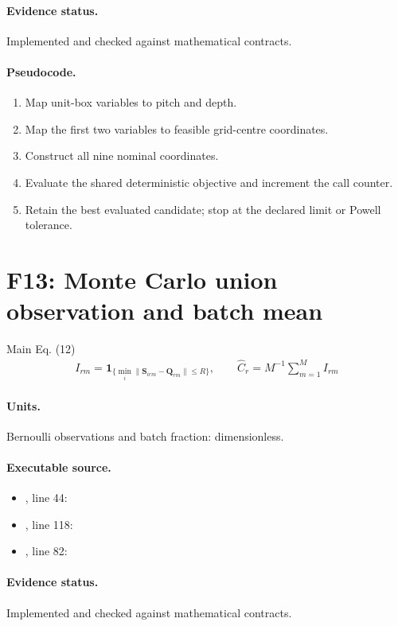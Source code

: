 \documentclass[10pt]{article}
\begin{document}
\paragraph{Evidence status.} Implemented and checked against mathematical contracts.
\paragraph{Pseudocode.}
\begin{enumerate}[leftmargin=*]
\item Map unit-box variables to pitch and depth.
\item Map the first two variables to feasible grid-centre coordinates.
\item Construct all nine nominal coordinates.
\item Evaluate the shared deterministic objective and increment the call counter.
\item Retain the best evaluated candidate; stop at the declared limit or Powell tolerance.
\end{enumerate}
\newpage
\section*{F13: Monte Carlo union observation and batch mean}
Main Eq. (12)
\begin{gather*}I_{rm}=\mathbf1_{\{\min_i\|\mathbf S_{irm}-\mathbf Q_{rm}\|\le R\}},\qquad\widehat C_r=M^{-1}\sum_{m=1}^{M}I_{rm}\end{gather*}
\paragraph{Units.} Bernoulli observations and batch fraction: dimensionless.
\paragraph{Executable source.}
\begin{itemize}[leftmargin=*]
\item {}, line 44: 
\item {}, line 118: 
\item {}, line 82: 
\end{itemize}
\paragraph{Evidence status.} Implemented and checked against mathematical contracts.
\end{document}
